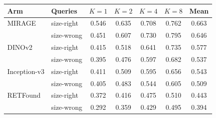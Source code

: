 \begin{tabular}{@{}llccccc@{}}
\toprule
Arm & Queries & $K=1$ & $K=2$ & $K=4$ & $K=8$ & Mean \\
\midrule
MIRAGE & size-right & 0.546 & 0.635 & 0.708 & 0.762 & 0.663 \\
 & size-wrong & 0.451 & 0.607 & 0.730 & 0.795 & 0.646 \\
\addlinespace[2pt]
DINOv2 & size-right & 0.415 & 0.518 & 0.641 & 0.735 & 0.577 \\
 & size-wrong & 0.395 & 0.476 & 0.597 & 0.682 & 0.537 \\
\addlinespace[2pt]
Inception-v3 & size-right & 0.411 & 0.509 & 0.595 & 0.656 & 0.543 \\
 & size-wrong & 0.405 & 0.483 & 0.544 & 0.605 & 0.509 \\
\addlinespace[2pt]
RETFound & size-right & 0.372 & 0.416 & 0.475 & 0.510 & 0.443 \\
 & size-wrong & 0.292 & 0.359 & 0.429 & 0.495 & 0.394 \\
\bottomrule
\end{tabular}
